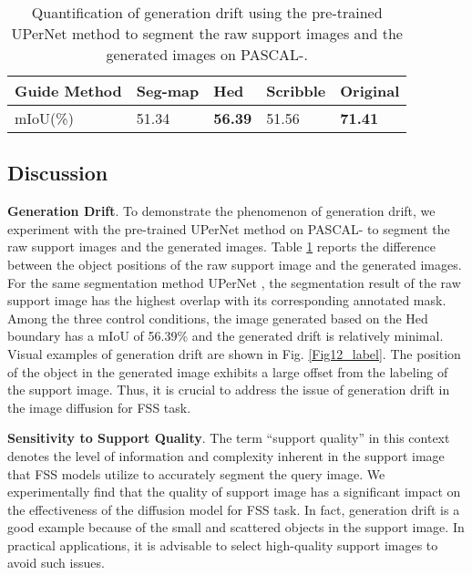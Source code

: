 \documentclass[sigconf]{acmart}
\begin{document}
\begin{table}[tb]
\caption{Quantification of generation drift using the pre-trained UPerNet method to segment the raw support images and the generated images on PASCAL-.}
\label{table_GDrift}
\begin{tabular}{lllll}
\toprule
Guide Method & Seg-map & Hed   & Scribble & Original \\ \hline
mIoU(\%)     & 51.34   & \textbf{56.39} & 51.56    & \textbf{71.41}   \\ \bottomrule
\end{tabular}
\end{table}


\subsection{Discussion}
\textbf{Generation Drift}. To demonstrate the phenomenon of generation drift, we experiment with the pre-trained UPerNet method \cite{xiao2018unified} on PASCAL- to segment the raw support images and the generated images. Table \ref{table_GDrift} reports the difference between the object positions of the raw support image and the generated images. For the same segmentation method UPerNet \cite{xiao2018unified}, the segmentation result of the raw support image has the highest overlap with its corresponding annotated mask. Among the three control conditions, the image generated based on the Hed boundary has a mIoU of 56.39\% and the generated drift is relatively minimal. Visual examples of generation drift are shown in Fig. \ref{Fig12_label}. The position of the object in the generated image exhibits a large offset from the labeling of the support image. Thus, it is crucial to address the issue of generation drift in the image diffusion for FSS task.

\textbf{Sensitivity to Support Quality}. The term ``support quality'' in this context denotes the level of information and complexity inherent in the support image that FSS models utilize to accurately segment the query image. We experimentally find that the quality of support image has a significant impact on the effectiveness of the diffusion model for FSS task. In fact, generation drift is a good example because of the small and scattered objects in the support image. In practical applications, it is advisable to select high-quality support images to avoid such issues.
\end{document}
